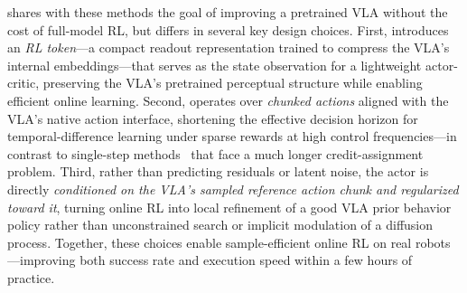 \MethodName{} shares with these methods the goal of improving a pretrained VLA without the cost of full-model RL, but differs in several key design choices.
First, \MethodName{} introduces an \emph{RL token}---a compact readout representation trained to compress the VLA's internal embeddings---that serves as the state observation for a lightweight actor-critic, preserving the VLA's pretrained perceptual structure while enabling efficient online learning.
Second, \MethodName{} operates over \emph{chunked actions} aligned with the VLA's native action interface, shortening the effective decision horizon for temporal-difference learning under sparse rewards at high control frequencies---in contrast to single-step methods~\cite{chen2025conrft,pi_dec,xiao2025selfimprovingvisionlanguageactionmodelsdata} that face a much longer credit-assignment problem.
Third, rather than predicting residuals or latent noise, the \MethodName{} actor is directly \emph{conditioned on the VLA's sampled reference action chunk and regularized toward it}, turning online RL into local refinement of a good VLA prior behavior policy rather than unconstrained search or implicit modulation of a diffusion process.
Together, these choices enable sample-efficient online RL on real robots---improving both success rate and execution speed within a few hours of practice.
